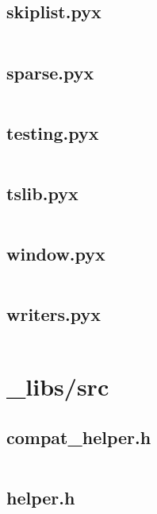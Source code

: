 \documentclass{article}
\begin{document}
\subsection{skiplist.pyx}
\inputminted{cython}{/home/dufferzafar/dev/@clones/pandas/pandas/_libs/skiplist.pyx}
\newpage

\subsection{sparse.pyx}
\inputminted{cython}{/home/dufferzafar/dev/@clones/pandas/pandas/_libs/sparse.pyx}
\newpage

\subsection{testing.pyx}
\inputminted{cython}{/home/dufferzafar/dev/@clones/pandas/pandas/_libs/testing.pyx}
\newpage

\subsection{tslib.pyx}
\inputminted{cython}{/home/dufferzafar/dev/@clones/pandas/pandas/_libs/tslib.pyx}
\newpage

\subsection{window.pyx}
\inputminted{cython}{/home/dufferzafar/dev/@clones/pandas/pandas/_libs/window.pyx}
\newpage

\subsection{writers.pyx}
\inputminted{cython}{/home/dufferzafar/dev/@clones/pandas/pandas/_libs/writers.pyx}
\newpage

\section{\_libs/src}

\subsection{compat\_helper.h}
\inputminted{c}{/home/dufferzafar/dev/@clones/pandas/pandas/_libs/src/compat_helper.h}
\newpage

\subsection{helper.h}
\inputminted{c}{/home/dufferzafar/dev/@clones/pandas/pandas/_libs/src/helper.h}
\newpage
\end{document}
